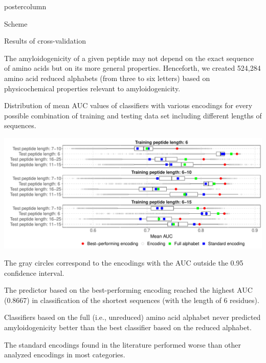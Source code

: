 \documentclass[final]{beamer}\usepackage[]{graphicx}\usepackage[]{color}
\makeatletter
\def\maxwidth{ %
  \ifdim\Gin@nat@width>\linewidth
    \linewidth
  \else
    \Gin@nat@width
  \fi
}
\newenvironment{knitrout}{}{} %
\makeatother
\begin{document}
\begin{frame}
\begin{columns}
\begin{column}{.53\textwidth}
\begin{beamercolorbox}[center,wd=\textwidth]{postercolumn}
\begin{minipage}[T]{.95\textwidth}
{\begin{block}{Scheme}
    \end{block}


\begin{block}{Results of cross-validation}

The amyloidogenicity of a given peptide may not depend on the exact sequence of 
amino acids but on its more general properties. 
Henceforth, we created 524,284 amino acid reduced alphabets (from three to six letters) based on physicochemical properties relevant to amyloidogenicity. 

Distribution of mean AUC values of classifiers with various encodings 
for every possible combination of training and testing data set including 
different lengths of sequences. 

\begin{knitrout}
\color{fgcolor}

{\centering \includegraphics[width=\maxwidth]{figure/unnamed-chunk-1-1} 

}



\end{knitrout}

\tiny
The 
gray circles correspond to the encodings with the AUC outside the 0.95 
confidence interval.

\normalsize	
\bigskip
The predictor based on the best-performing encoding reached the highest AUC (0.8667) 
in classification of the shortest sequences (with the length of 6 residues).

\bigskip

Classifiers based on the full (i.e., unreduced) amino acid alphabet never predicted 
amyloidogenicity better than the best classifier based on the reduced alphabet. 

\bigskip

The standard encodings found in the literature performed worse than other 
analyzed encodings in most categories.


\end{block}}
\end{minipage}
\end{beamercolorbox}
\end{column}
\end{columns}
\end{frame}
\end{document}
